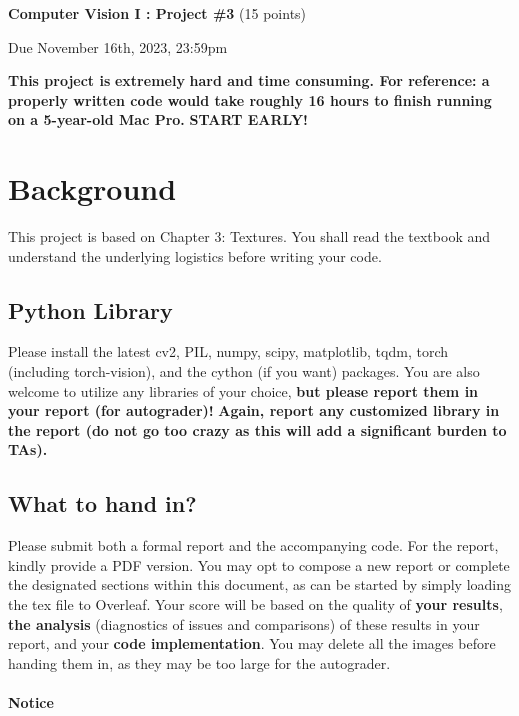 \documentclass[11pt]{article}
\begin{document}
{\centering \textbf{Computer Vision I : Project \#3} (15 points)\par} 
{\centering Due November 16th, 2023, 23:59pm\par}

\textbf{This project is} \textbf{\textcolor{color-C00000}{extremely}} \textbf{hard and time consuming. For reference: a properly written code would take roughly 16 hours to finish running on a 5-year-old Mac Pro.} \textbf{\textcolor{color-C00000}{START EARLY!}} 

\section{Background} 

This project is based on Chapter 3: Textures. You shall read the textbook and understand the underlying logistics before writing your code.

\subsection{Python Library}

Please install the latest cv2, PIL, numpy, scipy, matplotlib, tqdm, torch (including torch-vision), and the cython (if you want) packages. You are also welcome to utilize any libraries of your choice, \textbf{but please report them in your report (for autograder)!}
\color{red}
\textbf{Again, report any customized library in the report (do not go too crazy as this will add a significant burden to TAs).}
\color{black}

\subsection{What to hand in?}

Please submit both a formal report and the accompanying code. For the report, kindly provide a PDF version. You may opt to compose a new report or complete the designated sections within this document, as can be started by simply loading the tex file to Overleaf. Your score will be based on the quality of \textbf{your results}, \textbf{the analysis} (diagnostics of issues and comparisons) of these results in your report, and your \textbf{code implementation}. You may delete all the images before handing them in, as they may be too large for the autograder.

\paragraph{Notice}
\end{document}
